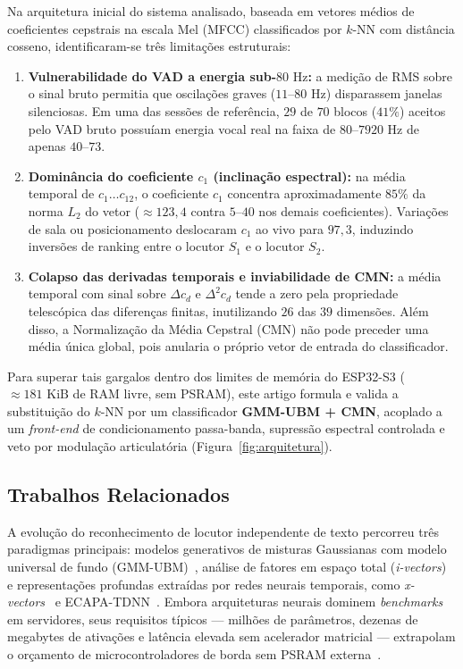 \documentclass[9pt,technote,a4paper]{IEEEtran}
\begin{document}
Na arquitetura inicial do sistema analisado, baseada em vetores médios de coeficientes cepstrais na escala Mel (MFCC) classificados por $k$-NN com distância cosseno, identificaram-se três limitações estruturais:
\begin{enumerate}
    \item \textbf{Vulnerabilidade do VAD a energia sub-$80\text{ Hz}$:} a medição de RMS sobre o sinal bruto permitia que oscilações graves ($11\text{--}80\text{ Hz}$) disparassem janelas silenciosas. Em uma das sessões de referência, $29$ de $70$ blocos ($41\%$) aceitos pelo VAD bruto possuíam energia vocal real na faixa de $80\text{--}7920\text{ Hz}$ de apenas $40\text{--}73$.
    \item \textbf{Dominância do coeficiente $c_1$ (inclinação espectral):} na média temporal de $c_1\dots c_{12}$, o coeficiente $c_1$ concentra aproximadamente $85\%$ da norma $L_2$ do vetor ($\approx 123{,}4$ contra $5\text{--}40$ nos demais coeficientes). Variações de sala ou posicionamento deslocaram $c_1$ ao vivo para $97{,}3$, induzindo inversões de ranking entre o locutor $S_1$ e o locutor $S_2$.
    \item \textbf{Colapso das derivadas temporais e inviabilidade de CMN:} a média temporal com sinal sobre $\Delta c_d$ e $\Delta^2 c_d$ tende a zero pela propriedade telescópica das diferenças finitas, inutilizando $26$ das $39$ dimensões. Além disso, a Normalização da Média Cepstral (CMN) não pode preceder uma média única global, pois anularia o próprio vetor de entrada do classificador.
\end{enumerate}

Para superar tais gargalos dentro dos limites de memória do ESP32-S3 ($\approx 181\text{ KiB}$ de RAM livre, sem PSRAM), este artigo formula e valida a substituição do $k$-NN por um classificador \textbf{GMM-UBM + CMN}, acoplado a um \textit{front-end} de condicionamento passa-banda, supressão espectral controlada e veto por modulação articulatória (Figura~\ref{fig:arquitetura}).

\subsection{Trabalhos Relacionados}
\label{sec:related}

A evolução do reconhecimento de locutor independente de texto percorreu três paradigmas principais: modelos generativos de misturas Gaussianas com modelo universal de fundo (GMM-UBM)~\cite{reynolds1995,reynolds2000}, análise de fatores em espaço total (\textit{i-vectors})~\cite{dehak2011} e representações profundas extraídas por redes neurais temporais, como \textit{x-vectors}~\cite{snyder2018} e ECAPA-TDNN~\cite{desplanques2020}. Embora arquiteturas neurais dominem \textit{benchmarks} em servidores, seus requisitos típicos --- milhões de parâmetros, dezenas de megabytes de ativações e latência elevada sem acelerador matricial --- extrapolam o orçamento de microcontroladores de borda sem PSRAM externa~\cite{warden2019}.
\end{document}
